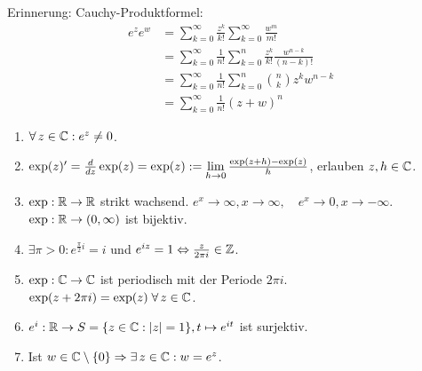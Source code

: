 \documentclass[../ana2.tex]{subfiles}
\begin{document}
Erinnerung: Cauchy-Produktformel: 
\begin{align*}
    e^z e^w &= \sum_{k=0}^\infty \frac{z^k}{k!} 
    \sum_{k=0}^\infty \frac{w^m}{m!} \\
    &= \sum_{k=0}^\infty \frac{1}{n!} 
    \sum_{k=0}^n \frac{z^k}{k!} \frac{w^{n-k}}{(n-k)!} \\
    &= \sum_{k=0}^\infty \frac{1}{n!} 
    \sum_{k=0}^n \binom{n}{k} z^k w^{n-k} \\
    &= \sum_{k=0}^\infty \frac{1}{n!} (z + w)^n
\end{align*}
\begin{satz}\leavevmode
    \begin{enumerate}[label=(\alph*)]
        \item \( \forall z \in \C: e^z \neq 0 \).
        \item \( \exp(z)' = \frac{d}{dz} \exp(z) = \exp(z) 
        := \lim\limits_{h\rightarrow{}0} \frac{\exp(z+h) - \exp(z)}{h} \), erlauben 
        \( z,h \in \mathbb{C} \).
        \item \( \exp:\mathbb{R}\rightarrow \mathbb{R} \) strikt wachsend. 
        \( e^x \rightarrow \infty, x \rightarrow \infty, \quad
        e^x \rightarrow 0, x\rightarrow -\infty \). \\
        \( \exp:\mathbb{R}\rightarrow (0,\infty) \) ist bijektiv.
        \item \( \exists \pi > 0: e^{\frac{\pi}{2}i} = i \) und
        \( e^{iz} = 1 \Leftrightarrow \frac{z}{2\pi i} \in \mathbb{Z} \).
        \item \( \exp:\mathbb{C}\rightarrow \mathbb{C} \) ist periodisch mit 
        der Periode \( 2\pi i \). 
        \( \exp(z + 2\pi i) = \exp(z) \;\forall z\in\C \).
        \item \( e^i:\mathbb{R}\rightarrow S = \{z \in \mathbb{C}: \left|z\right| = 1\}, 
        t \mapsto e^{it} \) ist surjektiv.
        \item Ist \( w \in \C \setminus \set{0} \Rightarrow 
        \exists z \in \C: w = e^z \).
    \end{enumerate}
\end{satz}
\end{document}
